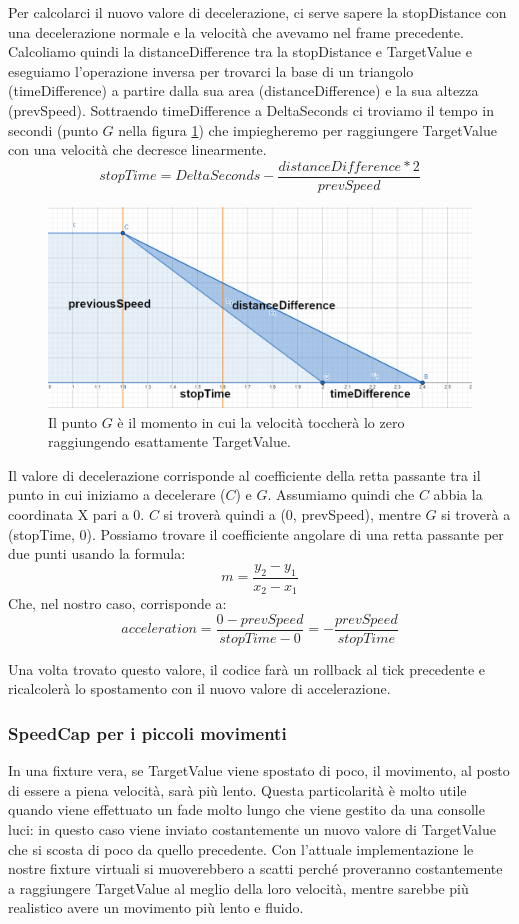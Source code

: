 \documentclass[main.tex]{subfiles}
\begin{document}
Per calcolarci il nuovo valore di decelerazione, ci serve sapere la stopDistance con una decelerazione normale e la velocità che avevamo nel frame precedente. Calcoliamo quindi la distanceDifference tra la stopDistance e TargetValue e eseguiamo l'operazione inversa per trovarci la base di un triangolo (timeDifference) a partire dalla sua area (distanceDifference) e la sua altezza (prevSpeed). Sottraendo timeDifference a DeltaSeconds ci troviamo il tempo in secondi (punto $G$ nella figura \ref{fig:4_OverrideDecelTimeDiff}) che impiegheremo per raggiungere TargetValue con una velocità che decresce linearmente.
\[stopTime = DeltaSeconds - \frac{distanceDifference * 2}{prevSpeed}\]
\begin{figure}[H]
    \centering
    \includegraphics[width=.95\linewidth]{img/interpolazione/OverrideDecelTimeDiff.png}
    \caption{Il punto $G$ è il momento in cui la velocità toccherà lo zero raggiungendo esattamente TargetValue.}
    \label{fig:4_OverrideDecelTimeDiff}
\end{figure}
\clearpage %
\noindent Il valore di decelerazione corrisponde al coefficiente della retta passante tra il punto in cui iniziamo a decelerare ($C$) e $G$. Assumiamo quindi che $C$ abbia la coordinata X pari a 0. $C$ si troverà quindi a (0, prevSpeed), mentre $G$ si troverà a (stopTime, 0). Possiamo trovare il coefficiente angolare di una retta passante per due punti usando la formula:
\[m = \frac{y_2 - y_1}{x_2 - x_1}\]
Che, nel nostro caso, corrisponde a:
\[acceleration = \frac{0 - prevSpeed}{stopTime - 0} = -\frac{prevSpeed}{stopTime}\]

Una volta trovato questo valore, il codice farà un rollback al tick precedente e ricalcolerà lo spostamento  con il nuovo valore di accelerazione.

\subsubsection{SpeedCap per i piccoli movimenti}\label{subsubsec:4_2_Speedcap}
In una fixture vera, se TargetValue viene spostato di poco, il movimento, al posto di essere a piena velocità, sarà più lento. Questa particolarità è molto utile quando viene effettuato un fade molto lungo che viene gestito da una consolle luci: in questo caso viene inviato costantemente un nuovo valore di TargetValue che si scosta di poco da quello precedente. Con l'attuale implementazione le nostre fixture virtuali si muoverebbero a scatti perché proveranno costantemente a raggiungere TargetValue al meglio della loro velocità, mentre sarebbe più realistico avere un movimento più lento e fluido. 
\end{document}
